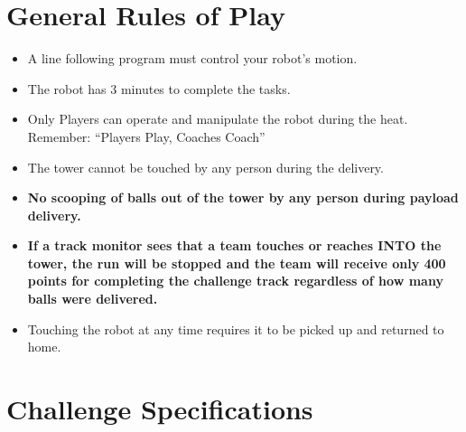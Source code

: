 \documentclass[a4paper,12pt]{article}
\begin{document}
\section{General Rules of Play}
\begin{itemize}
	\item A line following program must control your robot’s motion.
	\item The robot has 3 minutes to complete the tasks.
	\item Only Players can operate and manipulate the robot during the heat. Remember: “Players Play,
	Coaches Coach”
	\item The tower
	cannot be touched by any person during the delivery.
	\item \textbf{No scooping of balls out of the tower by any person during payload delivery.}
\item \textbf{If a track monitor sees that a team touches or reaches INTO the tower, the
run will be stopped and the team will receive only 400 points for completing
the challenge track regardless of how many balls were delivered.}
	\item Touching the robot at any time requires it to be picked up and returned to home.
\end{itemize}
\section{Challenge Specifications}
\end{document}
